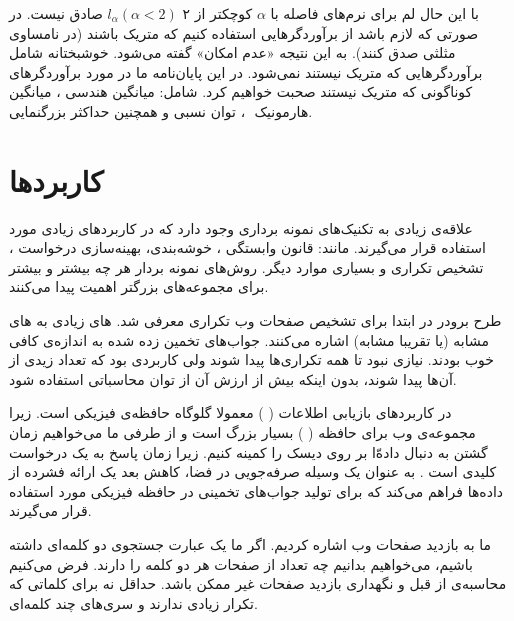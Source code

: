 با این حال لم 
برای نرم‌های فاصله با 
$\alpha$
کوچکتر از ۲ 
$l_\alpha ( \alpha < 2 )$
صادق نیست. در صورتی که لازم باشد از برآوردگرهایی استفاده کنیم که متریک باشند (در نامساوی مثلثی صدق کنند). به این نتیجه «عدم امکان»%
 گفته می‌شود.
\cite{litez39, litez109, litez33}
خوشبختانه شامل برآوردگرهایی که متریک نیستند نمی‌شود. در این پایان‌نامه ما در مورد برآوردگرهای کوناگونی که متریک نیستند صحبت خواهیم کرد. شامل: میانگین هندسی%
، میانگین هارمونیک
‌
، توان نسبی%
و همچنین حداکثر بزرگنمایی.

\section{کاربردها}
علاقه‌ی زیادی به تکنیک‌های نمونه برداری وجود دارد که در کاربردهای زیادی مورد استفاده قرار می‌گیرند. مانند: قانون وابستگی%
\cite{litez30, litez31}
، خوشه‌بندی، بهینه‌سازی درخواست%
\cite{litez136, litez44}
، تشخیص تکراری%
\cite{litez34, litez28}
و بسیاری موارد دیگر. روش‌های نمونه بردار هر چه بیشتر و بیشتر برای مجموعه‌های بزرگتر اهمیت پیدا می‌کنند.

طرح برودر%
\cite{litez34}
در ابتدا برای تشخیص صفحات وب تکراری معرفی شد. 
های زیادی به 
های مشابه (یا تقریبا مشابه) اشاره می‌کنند. جواب‌های تخمین زده شده به اندازه‌ی کافی خوب بودند. نیازی نبود تا همه تکراری‌ها پیدا شوند ولی کاربردی بود که تعداد زیدی از آن‌ها پیدا شوند، بدون اینکه بیش از ارزش آن از توان محاسباتی استفاده شود.

در کاربردهای بازیابی اطلاعات (
)%
معمولا گلوگاه حافظه‌ی فیزیکی است. زیرا مجموعه‌ی وب برای حافظه (
) بسیار بزرگ است و از طرفی ما می‌خواهیم زمان گشتن به دنبال داده‌ّا بر روی دیسک را کمینه کنیم. زیرا زمان پاسخ به یک درخواست کلیدی است
\cite{litez29}
. به عنوان یک وسیله صرفه‌جویی در فضا، کاهش بعد یک ارائه فشرده از داده‌ها فراهم می‌کند که برای تولید جواب‌های تخمینی در حافظه فیزیکی مورد استفاده قرار می‌گیرند.

ما به بازدید صفحات وب اشاره‌ کردیم. اگر ما یک عبارت جستجوی دو کلمه‌ای داشته باشیم، می‌خواهیم بدانیم چه تعداد از صفحات هر دو کلمه را دارند. فرض می‌کنیم محاسبه‌ی از قبل و نگهداری بازدید صفحات غیر ممکن باشد. حداقل نه برای کلماتی که تکرار زیادی ندارند و سری‌های چند کلمه‌ای.

